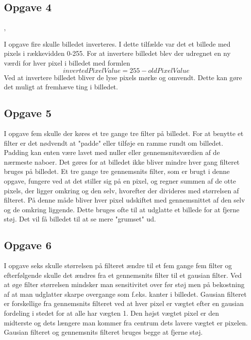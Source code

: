\documentclass{article}
\begin{document}
  

\subsection{Opgave 4}, 

I opgave fire skulle billedet inverteres. I dette tilfælde var det et billede med pixels i rækkevidden 0-255. For at invertere billedet blev der udregnet en ny værdi for hver pixel i billedet med formlen $$ invertedPixelValue = 255 - oldPixelValue $$ \newline 
Ved at invertere billedet bliver de lyse pixels mørke og omvendt. Dette kan gøre det muligt at fremhæve ting i billedet.   

\subsection{Opgave 5} 

I opgave fem skulle der køres et tre gange tre filter på billedet. For at benytte et filter er det nødvendt at "padde" eller tilføje en ramme rundt om billedet. Padding kan enten være lavet med nuller eller gennemsnitsværdien af de nærmeste naboer. Det gøres for at billedet ikke bliver mindre hver gang filteret bruges på billedet. \newline 
Et tre gange tre gennemsnits filter, som er brugt i denne opgave, fungere ved at det stiller sig på en pixel, og regner summen af de otte pixels, der ligger omkring og den selv, hvorefter der divideres med størrelsen af filteret. På denne måde bliver hver pixel udskiftet med gennemsnittet af den selv og de omkring liggende.  
Dette bruges ofte til at udglatte et billede for at fjerne støj. Det vil få billedet til at se mere "grumset" ud. 

  

\subsection{Opgave 6} 

I opgave seks skulle størrelsen på filteret ændre til et fem gange fem filter og efterfølgende skulle det ændres fra et gennemsnits filter til et gausian filter. \newline 
Ved at øge filter størrelsen mindsker man sensitivitet over før støj men på bekostning af at man udglatter skarpe overgange som f.eks. kanter i billedet. \newline 
Gausian filteret er forskellige fra gennemsnits filteret ved at hver pixel er vægtet efter en gausian fordeling i stedet for at alle har vægten 1. Den højst vægtet pixel er den midterste og dets længere man kommer fra centrum dets lavere vægtet er pixelen.\newline 
Gausian filteret og gennemsnits filteret bruges begge at fjerne støj.\newline 
\end{document}

